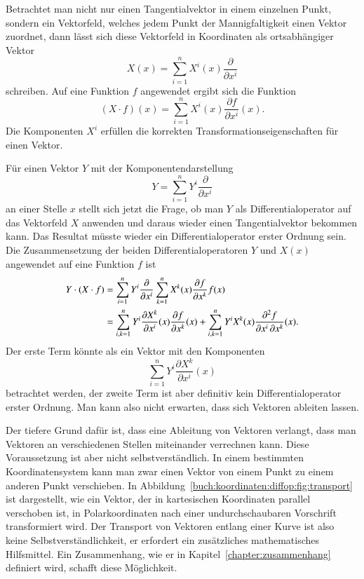 Betrachtet man nicht nur einen Tangentialvektor in einem einzelnen
Punkt, sondern ein Vektorfeld, welches jedem Punkt der Mannigfaltigkeit
einen Vektor zuordnet, dann lässt sich diese Vektorfeld in Koordinaten
als ortsabhängiger Vektor
\[
X(x)
=
\sum_{i=1}^n
X^i(x)
\frac{\partial}{\partial x^i}
\]
schreiben.
Auf eine Funktion $f$ angewendet ergibt sich die Funktion
\[
(X\cdot f)(x)
=
\sum_{i=1}^n X^i(x)\frac{\partial f}{\partial x^i}(x).
\]
Die Komponenten $X^i$ erfüllen die korrekten Transformationseigenschaften
für einen Vektor.

Für einen Vektor $Y$ mit der Komponentendarstellung
\[
Y
=
\sum_{i=1}^n
Y^i\frac{\partial}{\partial x^i}
\]
an einer Stelle $x$ stellt sich jetzt die Frage, ob man $Y$ als
Differentialoperator auf das Vektorfeld $X$ anwenden und daraus
wieder einen Tangentialvektor bekommen kann.
Das Resultat müsste wieder ein Differentialoperator erster Ordnung
sein.
Die Zusammensetzung der beiden Differentialoperatoren $Y$ und $X(x)$
angewendet auf eine Funktion $f$ ist
\begin{align}
Y\cdot(X\cdot f)
&=
\sum_{i=1}^n Y^i\frac{\partial}{\partial x^i}
\sum_{k=1}^n
X^k(x)
\frac{\partial f}{\partial x^k}f(x)
\notag
\\
&=
\sum_{i,k=1}^n
Y^i
\frac{\partial X^k}{\partial x^i}(x)
\frac{\partial f}{\partial x^k}(x)
+
\sum_{i,k=1}^n
Y^i
X^k(x)
\frac{\partial^2 f}{\partial x^i\,\partial x^k}(x).
\label{buch:koordinaten:diffop:eqn:vektorableitung}
\end{align}
Der erste Term könnte als ein Vektor mit den Komponenten 
\[
\sum_{i=1}^n
Y^i\frac{\partial X^k}{\partial x^i}(x)
\]
betrachtet werden, der zweite Term ist aber definitiv kein
Differentialoperator erster Ordnung.
Man kann also nicht erwarten, dass sich Vektoren ableiten lassen.

Der tiefere Grund dafür ist, dass eine Ableitung von Vektoren verlangt,
dass man Vektoren an verschiedenen Stellen miteinander verrechnen kann.
Diese Voraussetzung ist aber nicht selbstverständlich.
%
In einem bestimmten Koordinatensystem kann man zwar einen Vektor
von einem Punkt zu einem anderen Punkt verschieben.
In Abbildung~\ref{buch:koordinaten:diffop:fig:transport}
ist dargestellt, wie ein Vektor, der in kartesischen Koordinaten
parallel verschoben ist, in Polarkoordinaten nach einer undurchschaubaren
Vorschrift transformiert wird.
Der Transport von Vektoren entlang einer Kurve ist also keine
Selbstverständlichkeit, er erfordert ein zusätzliches mathematisches
Hilfsmittel.
Ein Zusammenhang, wie er in Kapitel~\ref{chapter:zusammenhang} definiert
wird, schafft diese Möglichkeit.

